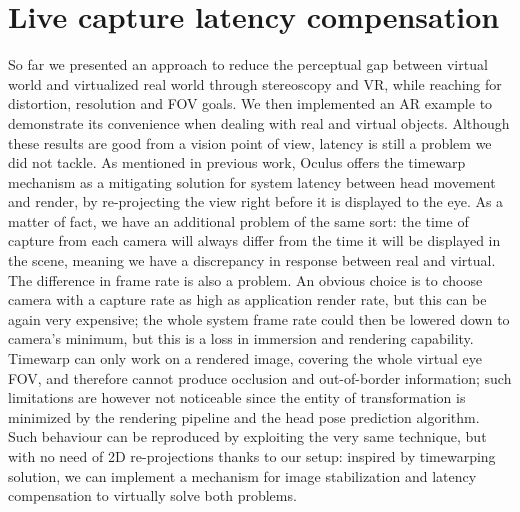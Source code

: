 \section{Live capture latency compensation}
So far we presented an approach to reduce the perceptual gap between virtual world and virtualized real world through stereoscopy and VR, while reaching for distortion, resolution and FOV goals. We then implemented an AR example to demonstrate its convenience when dealing with real and virtual objects. Although these results are good from a vision point of view, latency is still a problem we did not tackle.
As mentioned in previous work, Oculus offers the timewarp mechanism as a mitigating solution for system latency between head movement and render, by re-projecting the view right before it is displayed to the eye. As a matter of fact, we have an additional problem of the same sort: the time of capture from each camera will always differ from the time it will be displayed in the scene, meaning we have a discrepancy in response between real and virtual.\\
The difference in frame rate is also a problem. An obvious choice is to choose camera with a capture rate as high as application render rate, but this can be again very expensive; the whole system frame rate could then be lowered down to camera's minimum, but this is a loss in immersion and rendering capability.
Timewarp can only work on a rendered image, covering the whole virtual eye FOV, and therefore cannot produce occlusion and out-of-border information; such limitations are however not noticeable since the entity of transformation is minimized by the rendering pipeline and the head pose prediction algorithm. Such behaviour can be reproduced by exploiting the very same technique, but with no need of 2D re-projections thanks to our setup: inspired by timewarping solution, we can implement a mechanism for image stabilization and latency compensation to virtually solve both problems.

